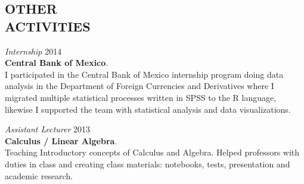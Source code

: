 \documentclass[margin]{res}
\begin{document}
\begin{resume}
\section{OTHER \\ ACTIVITIES} 

{\sl Internship} \hfill 2014 \\
\textbf{Central Bank of Mexico}. \\
I participated in the Central Bank of Mexico internship program doing data analysis in the Department of Foreign Currencies and Derivatives where I migrated multiple statistical processes written in SPSS to the R language, likewise I supported the team with statistical analysis and data visualizations.


{\sl Assistant Lecturer} \hfill 2013 \\
\textbf{Calculus / Linear Algebra}. \\
Teaching Introductory concepts of Calculus and Algebra. Helped professors with duties in class and creating class materials: notebooks, tests, presentation and academic research.



\end{resume}
\end{document}
